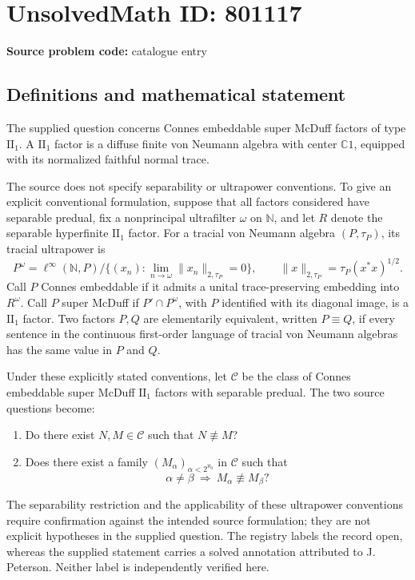 \documentclass[11pt]{article}
\newcommand{\N}{\mathbb{N}}
\newcommand{\C}{\mathbb{C}}
\begin{document}
\section*{UnsolvedMath ID: 801117}
\textbf{Source problem code:} catalogue entry
\subsection{Definitions and mathematical statement}
The supplied question concerns Connes embeddable super McDuff factors of type \(\mathrm{II}_1\). A \(\mathrm{II}_1\) factor is a diffuse finite von Neumann algebra with center \(\C 1\), equipped with its normalized faithful normal trace.

The source does not specify separability or ultrapower conventions. To give an explicit conventional formulation, suppose that all factors considered have separable predual, fix a nonprincipal ultrafilter \(\omega\) on \(\N\), and let \(R\) denote the separable hyperfinite \(\mathrm{II}_1\) factor. For a tracial von Neumann algebra \((P,\tau_P)\), its tracial ultrapower is
\[
P^\omega=\ell^\infty(\N,P)\big/\{(x_n):\lim_{n\to\omega}\|x_n\|_{2,\tau_P}=0\},
\qquad \|x\|_{2,\tau_P}=\tau_P(x^*x)^{1/2}.
\]
Call \(P\) Connes embeddable if it admits a unital trace-preserving embedding into \(R^\omega\). Call \(P\) super McDuff if \(P'\cap P^\omega\), with \(P\) identified with its diagonal image, is a \(\mathrm{II}_1\) factor. Two factors \(P,Q\) are elementarily equivalent, written \(P\equiv Q\), if every sentence in the continuous first-order language of tracial von Neumann algebras has the same value in \(P\) and \(Q\).

Under these explicitly stated conventions, let \(\mathcal C\) be the class of Connes embeddable super McDuff \(\mathrm{II}_1\) factors with separable predual. The two source questions become:
\begin{enumerate}
\item Do there exist \(N,M\in\mathcal C\) such that \(N\not\equiv M\)?
\item Does there exist a family \((M_\alpha)_{\alpha<2^{\aleph_0}}\) in \(\mathcal C\) such that
\[
\alpha\ne\beta\ \Longrightarrow\ M_\alpha\not\equiv M_\beta?
\]
\end{enumerate}
The separability restriction and the applicability of these ultrapower conventions require confirmation against the intended source formulation; they are not explicit hypotheses in the supplied question. The registry labels the record open, whereas the supplied statement carries a solved annotation attributed to J. Peterson. Neither label is independently verified here.
\end{document}
